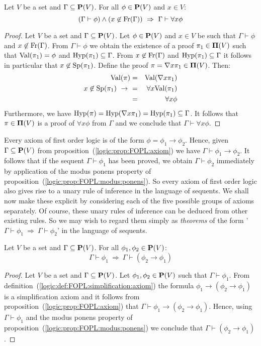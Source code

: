 \begin{prop}\label{logic:prop:FOPL:generalization}
Let $V$ be a set and $\Gamma\subseteq\mbox{${\bf P}(V)$}$. For all $\phi\in\mbox{${\bf P}(V)$}$ and
$x\in V$:
    \[
    (\Gamma\vdash\phi)\land (x\not\in\mbox{\rm Fr}(\Gamma))\ \Rightarrow\
    \Gamma\vdash\forall x \phi
    \]
\end{prop}
\begin{proof}
Let $V$ be a set and $\Gamma\subseteq\mbox{${\bf P}(V)$}$. Let $\phi\in\mbox{${\bf P}(V)$}$ and
$x\in V$ be such that $\Gamma\vdash\phi$ and
$x\not\in\mbox{\rm Fr}(\Gamma)$. From $\Gamma\vdash\phi$ we obtain the
existence of a proof $\pi_{1}\in\mbox{${\bf\Pi}(V)$}$ such that $\mbox{\rm Val}(\pi_{1})=\phi$
and $\mbox{\rm Hyp}(\pi_{1})\subseteq\Gamma$. From $x\not\in\mbox{\rm Fr}(\Gamma)$ and
$\mbox{\rm Hyp}(\pi_{1})\subseteq\Gamma$ it follows in particular that
$x\not\in\mbox{\rm Sp}(\pi_{1})$. Define the proof $\pi=\mbox{$\nabla$}
x\pi_{1}\in\mbox{${\bf\Pi}(V)$}$. Then:
    \begin{eqnarray*}
    \mbox{\rm Val}(\pi)&=&\mbox{\rm Val}(\mbox{$\nabla$} x\pi_{1})\\
    x\not\in\mbox{\rm Sp}(\pi_{1})\ \to\ &=&\forall x\mbox{\rm Val}(\pi_{1})\\
    &=&\forall x\phi
    \end{eqnarray*}
Furthermore, we have $\mbox{\rm Hyp}(\pi) = \mbox{\rm Hyp}(\mbox{$\nabla$}
x\pi_{1})=\mbox{\rm Hyp}(\pi_{1})\subseteq\Gamma$. It follows that
$\pi\in\mbox{${\bf\Pi}(V)$}$ is a proof of $\forall x\phi$ from $\Gamma$ and we
conclude that $\Gamma\vdash\forall x\phi$.
\end{proof}

Every axiom of first order logic is of the form
$\phi=\phi_{1}\to\phi_{2}$. Hence, given $\Gamma\subseteq\mbox{${\bf P}(V)$}$ from
proposition~(\ref{logic:prop:FOPL:axiom}) we have
$\Gamma\vdash\phi_{1}\to\phi_{2}$. It follows that if the sequent
$\Gamma\vdash\phi_{1}$ has been proved, we obtain
$\Gamma\vdash\phi_{2}$ immediately by application of the modus
ponens property of proposition~(\ref{logic:prop:FOPL:modus:ponens}).
So every axiom of first order logic also gives rise to a unary rule
of inference in the language of sequents. We shall now make these
explicit by considering each of the five possible groups of axioms
separately. Of course, these unary rules of inference can be deduced
from other existing rules. So we may wish to regard them simply as
{\em theorems} of the form '$\Gamma\vdash\phi_{1}\ \Rightarrow\
\Gamma\vdash\phi_{2}$' in the language of sequents.

\begin{prop}\label{logic:prop:FOPL:simplification}
Let $V$ be a set and $\Gamma\subseteq\mbox{${\bf P}(V)$}$. For all
$\phi_{1},\phi_{2}\in\mbox{${\bf P}(V)$}$:
    \[
    \Gamma\vdash\phi_{1}\ \Rightarrow\ \Gamma\vdash (\phi_{2}\to\phi_{1})
    \]
\end{prop}
\begin{proof}
Let $V$ be a set and $\Gamma\subseteq\mbox{${\bf P}(V)$}$. Let
$\phi_{1},\phi_{2}\in\mbox{${\bf P}(V)$}$ such that $\Gamma\vdash\phi_{1}$. From
definition~(\ref{logic:def:FOPL:simplification:axiom}) the formula
$\phi_{1}\to(\phi_{2}\to\phi_{1})$ is a simplification axiom and it
follows from proposition~(\ref{logic:prop:FOPL:axiom}) that
$\Gamma\vdash\phi_{1}\to(\phi_{2}\to\phi_{1})$. Hence, using
$\Gamma\vdash\phi_{1}$ and the modus ponens property of
proposition~(\ref{logic:prop:FOPL:modus:ponens}) we conclude that
$\Gamma\vdash(\phi_{2}\to\phi_{1})$.
\end{proof}


